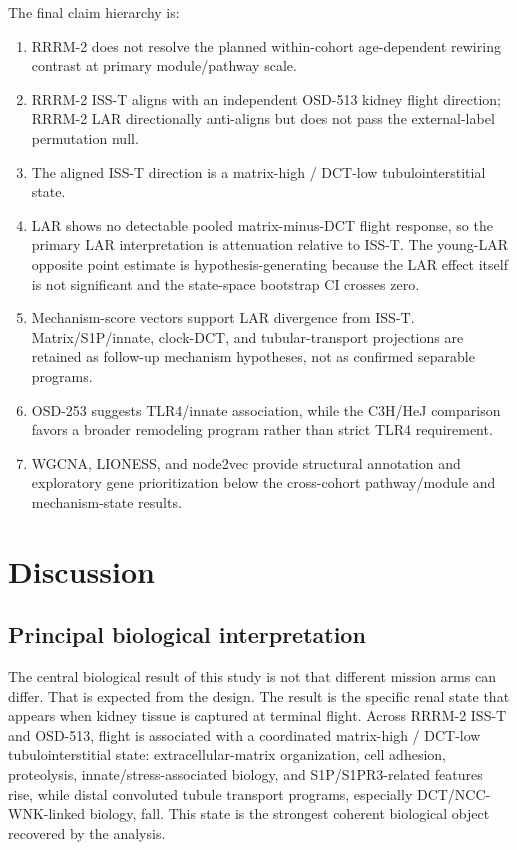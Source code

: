 \documentclass[11pt]{article}
\begin{document}
The final claim hierarchy is:
\begin{enumerate}
  \item RRRM-2 does not resolve the planned within-cohort age-dependent rewiring contrast at primary module/pathway scale.
  \item RRRM-2 ISS-T aligns with an independent OSD-513 kidney flight direction; RRRM-2 LAR directionally anti-aligns but does not pass the external-label permutation null.
  \item The aligned ISS-T direction is a matrix-high / DCT-low tubulointerstitial state.
  \item LAR shows no detectable pooled matrix-minus-DCT flight response, so the primary LAR interpretation is attenuation relative to ISS-T. The young-LAR opposite point estimate is hypothesis-generating because the LAR effect itself is not significant and the state-space bootstrap CI crosses zero.
  \item Mechanism-score vectors support LAR divergence from ISS-T. Matrix/S1P/innate, clock-DCT, and tubular-transport projections are retained as follow-up mechanism hypotheses, not as confirmed separable programs.
  \item OSD-253 suggests TLR4/innate association, while the C3H/HeJ comparison favors a broader remodeling program rather than strict TLR4 requirement.
  \item WGCNA, LIONESS, and node2vec provide structural annotation and exploratory gene prioritization below the cross-cohort pathway/module and mechanism-state results.
\end{enumerate}

\section{Discussion}

\subsection{Principal biological interpretation}

The central biological result of this study is not that different mission arms can differ. That is expected from the design. The result is the specific renal state that appears when kidney tissue is captured at terminal flight. Across RRRM-2 ISS-T and OSD-513, flight is associated with a coordinated matrix-high / DCT-low tubulointerstitial state: extracellular-matrix organization, cell adhesion, proteolysis, innate/stress-associated biology, and S1P/S1PR3-related features rise, while distal convoluted tubule transport programs, especially DCT/NCC-WNK-linked biology, fall. This state is the strongest coherent biological object recovered by the analysis.
\end{document}
